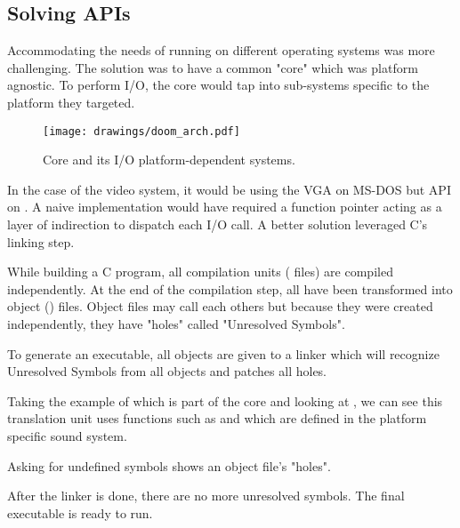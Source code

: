 \subsection{Solving APIs}
Accommodating the needs of running on different operating systems was more challenging. The solution was to have a common "core" which was platform agnostic. To perform I/O, the core would tap into sub-systems specific to the platform they targeted.\\
\par
\begin{figure}[H]
\centering
\texttt{[image: drawings/doom\_arch.pdf]}
\caption{\doom{} Core and its I/O platform-dependent systems.}
\end{figure}
\par
In the case of the video system, it would be using the VGA on MS-DOS but  API on \NeXT. A naive implementation would have required a function pointer acting as a layer of indirection to dispatch each I/O call. A better solution leveraged C's linking step.\\
\par
 While building a C program, all compilation units ( files) are compiled independently. At the end of the compilation step, all  have been transformed into object () files. Object files may call each others but because they were created independently, they have "holes" called "Unresolved Symbols".\\
\par
 To generate an executable, all objects are given to a linker which will recognize Unresolved Symbols from all objects and patches all holes.\\
 \par
 Taking the example of  which is part of the core and looking at , we can see this translation unit uses functions such as  and  which are defined in the platform specific sound system. 






 Asking  for undefined symbols shows an object file's "holes".\\
 \par
{}
\par
After the linker is done, there are no more unresolved symbols. The final executable is ready to run.\\
\par
{}




